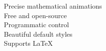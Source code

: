 \documentclass[preview]{standalone}
\begin{document}
Precise mathematical animations\\Free and open-source\\Programmatic control\\Beautiful default styles\\Supports LaTeX\\
\end{document}
